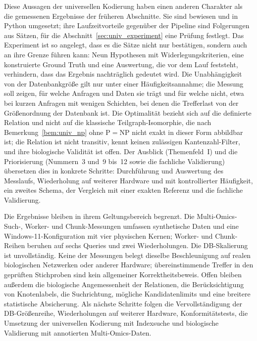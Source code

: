 \documentclass[a4paper,12pt, twoside]{report}
\theoremstyle{definition}
\begin{document}
Diese Aussagen der universellen Kodierung haben einen anderen Charakter als die gemessenen Ergebnisse der früheren Abschnitte. Sie sind bewiesen und in Python umgesetzt; ihre Laufzeitvorteile gegenüber der Pipeline sind Folgerungen aus Sätzen, für die Abschnitt~\ref{sec:univ_experiment} eine Prüfung festlegt. Das Experiment ist so angelegt, dass es die Sätze nicht nur bestätigen, sondern auch an ihre Grenze führen kann: Neun Hypothesen mit Widerlegungskriterien, eine konstruierte Ground Truth und eine Auswertung, die vor dem Lauf feststeht, verhindern, dass das Ergebnis nachträglich gedeutet wird. Die Unabhängigkeit von der Datenbankgröße gilt nur unter einer Häufigkeitsannahme; die Messung soll zeigen, für welche Anfragen und Daten sie trägt und für welche nicht, etwa bei kurzen Anfragen mit wenigen Schichten, bei denen die Trefferlast von der Größenordnung der Datenbank ist. Die Optimalität bezieht sich auf die definierte Relation und nicht auf die klassische Teilgraph-Isomorphie, die nach Bemerkung~\ref{bem:univ_np} ohne $\mathrm{P}=\mathrm{NP}$ nicht exakt in dieser Form abbildbar ist; die Relation ist nicht transitiv, kennt keinen zulässigen Kantenzahl-Filter, und ihre biologische Validität ist offen. Der Ausblick (Themenfeld~I) und die Priorisierung (Nummern~3 und~9 bis~12 sowie die fachliche Validierung) übersetzen dies in konkrete Schritte: Durchführung und Auswertung des Messlaufs, Wiederholung auf weiterer Hardware und mit kontrollierter Häufigkeit, ein zweites Schema, der Vergleich mit einer exakten Referenz und die fachliche Validierung.

Die Ergebnisse bleiben in ihrem Geltungsbereich begrenzt. Die Multi-Omics-Such-, Worker- und Chunk-Messungen umfassen synthetische Daten und eine Windows-11-Konfiguration mit vier physischen Kernen; Worker- und Chunk-Reihen beruhen auf sechs Queries und zwei Wiederholungen. Die DB-Skalierung ist unvollständig. Keine der Messungen belegt dieselbe Beschleunigung auf realen biologischen Netzwerken oder anderer Hardware; übereinstimmende Treffer in den geprüften Stichproben sind kein allgemeiner Korrektheitsbeweis. Offen bleiben außerdem die biologische Angemessenheit der Relationen, die Berücksichtigung von Knotenlabels, die Suchrichtung, mögliche Kandidatenlimits und eine breitere statistische Absicherung. Als nächste Schritte folgen die Vervollständigung der DB-Größenreihe, Wiederholungen auf weiterer Hardware, Konformitätstests, die Umsetzung der universellen Kodierung mit Indexsuche und biologische Validierung mit annotierten Multi-Omics-Daten.
\end{document}
